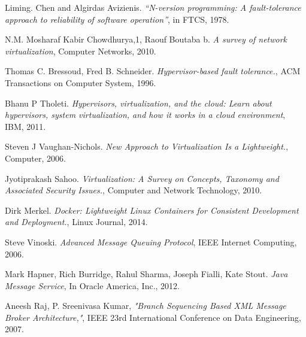 \documentclass[a4paper,11pt,twoside]{article}
\begin{document}
\begin{thebibliography}{1}
 	 Liming. Chen and Algirdas Avizienis. {\em  “N-version programming: A fault-tolerance approach to reliability of software operation”}, in FTCS, 1978. 
   
	 N.M. Mosharaf Kabir Chowdhurya,1, Raouf Boutaba b. {\em A survey of network virtualization}, Computer Networks, 2010.
   
	 Thomas C. Bressoud, Fred B. Schneider. {\em Hypervisor-based fault tolerance.}, ACM 	Transactions on Computer System, 1996.
	   
  	 Bhanu P Tholeti. {\em Hypervisors, virtualization, and the cloud: Learn about hypervisors, system virtualization, and how it works in a cloud environment}, IBM, 2011. 

	  Steven J Vaughan-Nichols. {\em New Approach to Virtualization Is a Lightweight.}, Computer, 2006.  
	 
	   Jyotiprakash Sahoo. {\em Virtualization: A Survey on Concepts, Taxonomy and Associated Security Issues.}, Computer and Network Technology, 2010.
  
    Dirk Merkel. {\em Docker: Lightweight Linux Containers for Consistent Development and Deployment.}, Linux Journal, 2014.
	
	 Steve Vinoski. {\em Advanced Message Queuing Protocol}, IEEE Internet Computing, 2006. 

     Mark Hapner, Rich Burridge, Rahul Sharma, Joseph Fialli, Kate Stout. {\em Java Message Service}, In Oracle America, Inc., 2012.

 Aneesh Raj, P. Sreenivasa Kumar, {\em "Branch Sequencing Based XML Message Broker Architecture,"}, IEEE 23rd International Conference on Data Engineering, 2007.  
  
  \end{thebibliography}
\end{document}
